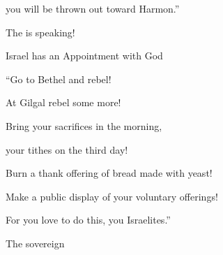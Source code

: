 {\par }{\Q you will be thrown
out toward Harmon.”
\par }{\Q The
{}
is speaking!
\par }{\SH Israel has an Appointment with God
\par }{\Q {}“Go
to Bethel
and rebel!

\par }{\Q At Gilgal
rebel
some more!
\par }{\Q Bring
your sacrifices
in the morning,
\par }{\Q your tithes
on the third
day!
\par }{\Q {}Burn
a thank offering
of bread made with yeast!

\par }{\Q Make a public
display
of your voluntary
offerings!

\par }{\Q For
you love
to do this,
you Israelites.”
\par }{\Q The sovereign

}
